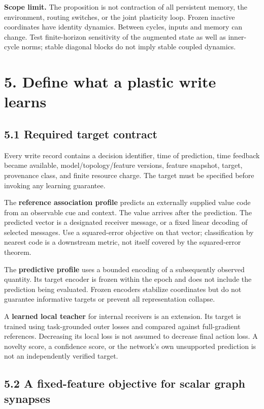 \documentclass[
  11pt,
  a4paper,
]{article}
\begin{document}
\textbf{Scope limit.} The proposition is not contraction of all
persistent memory, the environment, routing switches, or the joint
plasticity loop. Frozen inactive coordinates have identity dynamics.
Between cycles, inputs and memory can change. Test finite-horizon
sensitivity of the augmented state as well as inner-cycle norms; stable
diagonal blocks do not imply stable coupled dynamics.

\section{5. Define what a plastic write
learns}\label{define-what-a-plastic-write-learns}

\subsection{5.1 Required target
contract}\label{required-target-contract}

Every write record contains a decision identifier, time of prediction,
time feedback became available, model/topology/feature versions, feature
snapshot, target, provenance class, and finite resource charge. The
target must be specified before invoking any learning guarantee.

The \textbf{reference association profile} predicts an externally
supplied value code from an observable cue and context. The value
arrives after the prediction. The predicted vector is a designated
receiver message, or a fixed linear decoding of selected messages. Use a
squared-error objective on that vector; classification by nearest code
is a downstream metric, not itself covered by the squared-error theorem.

The \textbf{predictive profile} uses a bounded encoding of a
subsequently observed quantity. Its target encoder is frozen within the
epoch and does not include the prediction being evaluated. Frozen
encoders stabilize coordinates but do not guarantee informative targets
or prevent all representation collapse.

A \textbf{learned local teacher} for internal receivers is an extension.
Its target is trained using task-grounded outer losses and compared
against full-gradient references. Decreasing its local loss is not
assumed to decrease final action loss. A novelty score, a confidence
score, or the network's own unsupported prediction is not an
independently verified target.

\subsection{5.2 A fixed-feature objective for scalar graph
synapses}\label{a-fixed-feature-objective-for-scalar-graph-synapses}
\end{document}
